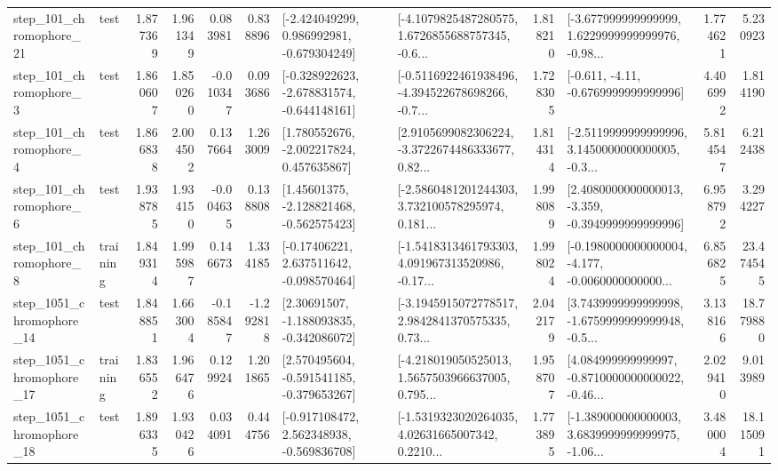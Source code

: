 \begin{tabular}{llrrrrllrlrr}
  step\_101\_chromophore\_21 &      test &      1.877369 &    1.961349 &      0.083981 &  0.838896 &   [-2.424049299, 0.986992981, -0.679304249] &  [-4.1079825487280575, 1.6726855688757345, -0.6... &       1.818210 &  [-3.677999999999999, 1.6229999999999976, -0.98... &            1.774621 &          5.230923 \\
   step\_101\_chromophore\_3 &      test &      1.860607 &    1.850260 &     -0.010347 &  0.093686 &  [-0.328922623, -2.678831574, -0.644148161] &  [-0.5116922461938496, -4.394522678698266, -0.7... &       1.728305 &               [-0.611, -4.11, -0.6769999999999996] &            4.406992 &          1.814190 \\
   step\_101\_chromophore\_4 &      test &      1.866838 &    2.004502 &      0.137664 &  1.263009 &    [1.780552676, -2.002217824, 0.457635867] &  [2.9105699082306224, -3.3722674486333677, 0.82... &       1.814314 &  [-2.5119999999999996, 3.1450000000000005, -0.3... &            5.814547 &          6.212438 \\
   step\_101\_chromophore\_6 &      test &      1.938785 &    1.934150 &     -0.004635 &  0.138808 &    [1.45601375, -2.128821468, -0.562575423] &  [-2.5860481201244303, 3.732100578295974, 0.181... &       1.998089 &  [2.4080000000000013, -3.359, -0.3949999999999996] &            6.958792 &          3.294227 \\
   step\_101\_chromophore\_8 &  training &      1.849314 &    1.995987 &      0.146673 &  1.334185 &    [-0.17406221, 2.637511642, -0.098570464] &  [-1.5418313461793303, 4.091967313520986, -0.17... &       1.998024 &  [-0.1980000000000004, -4.177, -0.0060000000000... &            6.856825 &         23.474545 \\
 step\_1051\_chromophore\_14 &      test &      1.848851 &    1.663004 &     -0.185847 & -1.292818 &    [2.30691507, -1.188093835, -0.342086072] &  [-3.1945915072778517, 2.9842841370575335, 0.73... &       2.042179 &  [3.7439999999999998, -1.6759999999999948, -0.5... &            3.138166 &         18.779880 \\
 step\_1051\_chromophore\_17 &  training &      1.836552 &    1.966476 &      0.129924 &  1.201865 &   [2.570495604, -0.591541185, -0.379653267] &  [-4.218019050525013, 1.5657503966637005, 0.795... &       1.958707 &  [4.084999999999997, -0.8710000000000022, -0.46... &            2.029410 &          9.013989 \\
 step\_1051\_chromophore\_18 &      test &      1.896335 &    1.930426 &      0.034091 &  0.444756 &   [-0.917108472, 2.562348938, -0.569836708] &  [-1.5319323020264035, 4.02631665007342, 0.2210... &       1.773895 &  [-1.389000000000003, 3.6839999999999975, -1.06... &            3.480004 &         18.115091 \\

\end{tabular}
